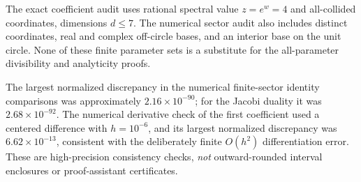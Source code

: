 \documentclass[11pt,a4paper]{article}
\numberwithin{equation}{section}
\theoremstyle{definition}
\theoremstyle{remark}
\begin{document}
{\raggedright{}\par}

The exact coefficient audit uses rational spectral value $z=e^w=4$ and
all-collided coordinates, dimensions $d\le7$. The numerical sector audit
also includes distinct coordinates, real and complex off-circle bases,
and an interior base on the unit circle. None of these finite parameter
sets is a substitute for the all-parameter divisibility and analyticity
proofs.

The largest normalized discrepancy in the numerical finite-sector
identity comparisons was approximately $2.16\times10^{-90}$; for the
Jacobi duality it was $2.68\times10^{-92}$. The numerical derivative
check of the first coefficient used a centered difference with
$h=10^{-6}$, and its largest normalized discrepancy was
$6.62\times10^{-13}$, consistent with the deliberately finite
$O(h^2)$ differentiation error. These are high-precision consistency
checks, \emph{not} outward-rounded interval enclosures or
proof-assistant certificates.
\end{document}
